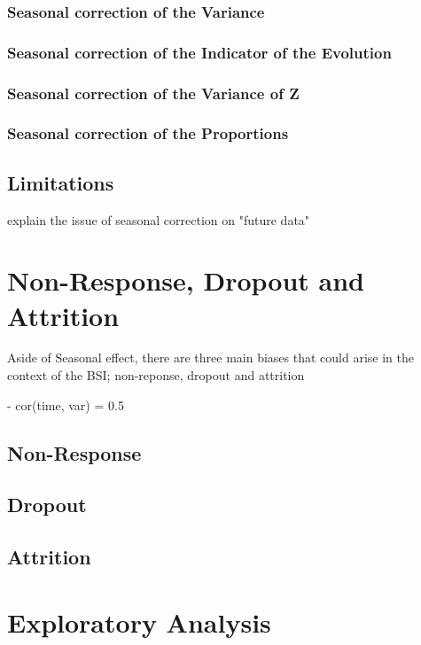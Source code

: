 \documentclass[12pt,a4paper,oneside]{book}
\begin{document}
\subsection{Seasonal correction of the Variance}

\subsection{Seasonal correction of the Indicator of the Evolution}

\subsection{Seasonal correction of the Variance of Z}

\subsection{Seasonal correction of the Proportions}

\section{Limitations}

explain the issue of seasonal correction on "future data" 



\chapter{Non-Response, Dropout and Attrition}

Aside of Seasonal effect, there are three main biases that could arise in the context of the BSI; non-reponse, dropout and attrition

- cor(time, var) = 0.5


\section{Non-Response}

\section{Dropout}

\section{Attrition}




\chapter{Exploratory Analysis}
\end{document}
